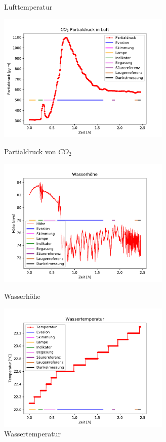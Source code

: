 \documentclass[12pt]{article}
\begin{document}
\begin{figure}[H]
{		\caption{Lufttemperatur}
	}
	\hfill%
	\parbox{82.5mm}{
		\centering
		\includegraphics[width=82.5mm]{VE-Wasser/Partialdruck}
		\caption{Partialdruck von $CO_2$}
	}
	\centering
	\parbox{82.5mm}{
		\centering
		\includegraphics[width=82.5mm]{VE-Wasser/Wasserhoehe}
		\caption{Wasserh\"ohe }
	}
	\hfill%
	\parbox{82.5mm}{
		\centering
		\includegraphics[width=82.5mm]{VE-Wasser/Wassertemperatur}
		\caption{Wassertemperatur }
	}
\end{figure}
\end{document}
